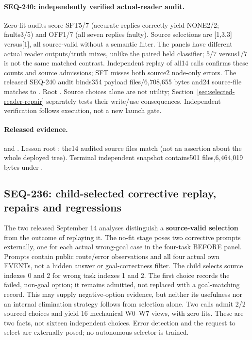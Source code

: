 \documentclass[11pt]{article}
\begin{document}
\paragraph{SEQ-240: independently verified actual-reader audit.}
Zero-fit audits score SFT5/7 (accurate replies correctly yield NONE2/2;
faults3/5) and OFF1/7 (all seven replies faulty). Source selections are
[1,3,3] versus[1], all source-valid without a semantic filter. The panels have
different actual reader outputs/truth mixes, unlike the paired held classifier;
5/7 versus1/7 is not the same matched contrast. Independent replay of all14
calls confirms these counts and source admissions; SFT misses both source2
node-only errors. The released SEQ-240 audit
binds354 payload files/6,708,655 bytes and24 source-file matches to
. Root
. Source choices alone are
not utility; Section~\ref{sec:selected-reader-repair} separately tests their
write/use consequences. Independent verification follows execution, not a new
launch gate.

\paragraph{Released evidence.}
 and
.
Lesson root ; the14 audited
source files match 
(not an assertion about the whole deployed tree). Terminal independent snapshot
contains501 files,6,464,019 bytes under
.

\subsection{SEQ-236: child-selected corrective replay, repairs and regressions}
\label{sec:corrective-replay}

The two released September 14 analyses distinguish a \textbf{source-valid selection}
from the outcome of replaying it. The no-fit stage poses two corrective prompts
externally, one for each actual wrong-goal case in the four-task BEFORE panel.
Prompts contain public route/error observations and all four actual own EVENTs,
not a hidden answer or goal-correctness filter. The child selects source indexes
0 and 2 for wrong task indexes 1 and 2. The first choice records the failed,
non-goal option; it remains admitted, not replaced with a goal-matching record.
This may supply negative-option evidence, but neither its usefulness nor an
internal elimination strategy follows from selection alone. Two calls admit
2/2 sourced choices and yield 16 mechanical W0--W7 views, with zero fits.
These are two facts, not sixteen independent choices. Error detection and the
request to select are externally posed; no autonomous selector is trained.
\end{document}
